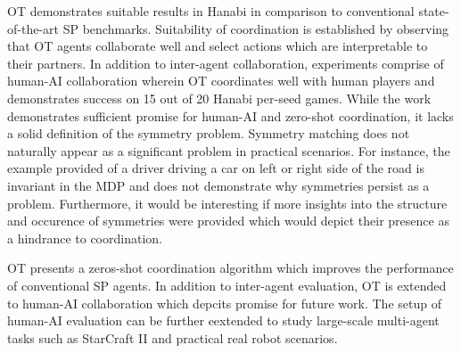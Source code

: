 \documentclass[11pt,letterpaper]{article}
\begin{document}
OT demonstrates suitable results in Hanabi in comparison to conventional state-of-the-art SP benchmarks. Suitability of coordination is established by observing that OT agents collaborate well and select actions which are interpretable to their partners. In addition to inter-agent collaboration, experiments comprise of human-AI collaboration wherein OT coordinates well with human players and demonstrates success on 15 out of 20 Hanabi per-seed games. While the work demonstrates sufficient promise for human-AI and zero-shot coordination, it lacks a solid definition of the symmetry problem. Symmetry matching does not naturally appear as a significant problem in practical scenarios. For instance, the example provided of a driver driving a car on left or right side of the road is invariant in the MDP and does not demonstrate why symmetries persist as a problem. Furthermore, it would be interesting if more insights into the structure and occurence of symmetries were provided which would depict their presence as a hindrance to coordination. 

OT presents a zeros-shot coordination algorithm which improves the performance of conventional SP agents. In addition to inter-agent evaluation, OT is extended to human-AI collaboration which depcits promise for future work. The setup of human-AI evaluation can be further eextended to study large-scale multi-agent tasks such as StarCraft II and practical real robot scenarios. 
\end{document}
